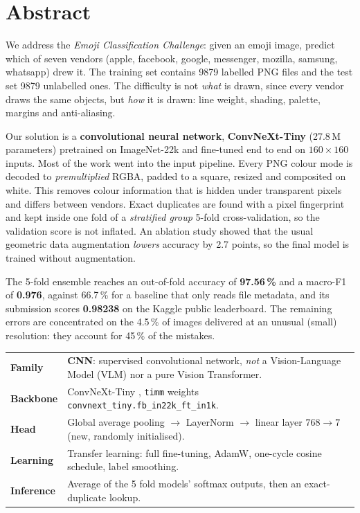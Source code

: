 \documentclass[11pt,a4paper]{article}
\newcommand{\code}[1]{\texttt{\small #1}}
\newcommand{\vendor}[1]{\textsf{#1}}
\newcommand{\kagglepublic}{0.98238}
\begin{document}
\section*{Abstract}

We address the \emph{Emoji Classification Challenge}: given an emoji image, predict which of seven
vendors (\vendor{apple}, \vendor{facebook}, \vendor{google}, \vendor{messenger}, \vendor{mozilla},
\vendor{samsung}, \vendor{whatsapp}) drew it. The training set contains \num{9879} labelled PNG files
and the test set \num{9879} unlabelled ones. The difficulty is not \emph{what} is drawn, since every vendor
draws the same objects, but \emph{how} it is drawn: line weight, shading, palette, margins and
anti-aliasing.

Our solution is a \textbf{convolutional neural network}, \textbf{ConvNeXt-Tiny}
(\num{27.8}\,M parameters) pretrained on ImageNet-22k and fine-tuned end to end on $160\times160$ inputs.
Most of the work went into the input pipeline. Every PNG colour mode is decoded to \emph{premultiplied}
RGBA, padded to a square, resized and composited on white. This removes colour information that is
hidden under transparent pixels and differs between vendors. Exact duplicates are found with a pixel
fingerprint and kept inside one fold of a \emph{stratified group} 5-fold cross-validation, so the validation
score is not inflated. An ablation study showed that the usual geometric data augmentation
\emph{lowers} accuracy by 2.7 points, so the final model is trained without augmentation.

The 5-fold ensemble reaches an out-of-fold accuracy of \textbf{97.56\,\%} and a macro-F1 of
\textbf{0.976}, against 66.7\,\% for a baseline that only reads file metadata, and its submission scores
\textbf{\kagglepublic} on the Kaggle public leaderboard. The remaining errors
are concentrated on the 4.5\,\% of images delivered at an unusual (small) resolution: they account for
45\,\% of the mistakes.

\vspace{0.4cm}
\begin{keybox}[title={Model chosen at a glance}]
\begin{tabularx}{\linewidth}{@{}>{\bfseries}l X@{}}
Family        & \textbf{CNN}: supervised convolutional network, \emph{not} a Vision-Language Model (VLM) nor a pure Vision Transformer. \\
Backbone      & ConvNeXt-Tiny \cite{liu2022convnext}, \code{timm} weights \code{convnext\_tiny.fb\_in22k\_ft\_in1k}. \\
Head          & Global average pooling $\rightarrow$ LayerNorm $\rightarrow$ linear layer $768\rightarrow7$ (new, randomly initialised). \\
Learning      & Transfer learning: full fine-tuning, AdamW, one-cycle cosine schedule, label smoothing. \\
Inference     & Average of the 5 fold models' softmax outputs, then an exact-duplicate lookup. \\
\end{tabularx}
\end{keybox}
\end{document}
